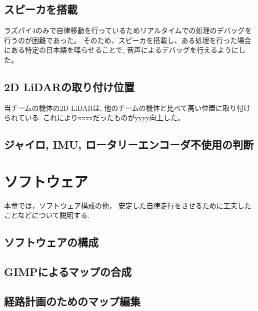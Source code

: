 \documentclass[twocolumn,9pt]{jsproceedings}
\begin{document}
\subsection{スピーカを搭載}

ラズパイ4のみで自律移動を行っているためリアルタイムでの処理のデバッグを行うのが困難であった。
そのため、スピーカを搭載し、ある処理を行った場合にある特定の日本語を喋らせることで, 
音声によるデバッグを行えるようにした。%

\subsection{2D LiDARの取り付け位置}

当チームの機体の2D LiDARは, 他のチームの機体と比べて高い位置に取り付けられている.
\cite{RTshop}
これによりxxxxだったものがyyyy向上した。

\subsection{ジャイロ, IMU, ロータリーエンコーダ不使用の判断}


\section{ソフトウェア}

本章では，ソフトウェア構成の他，
安定した自律走行をさせるために工夫したことなどについて説明する.


\subsection{ソフトウェアの構成}

\subsection{GIMPによるマップの合成} %

\subsection{経路計画のためのマップ編集}
\end{document}
